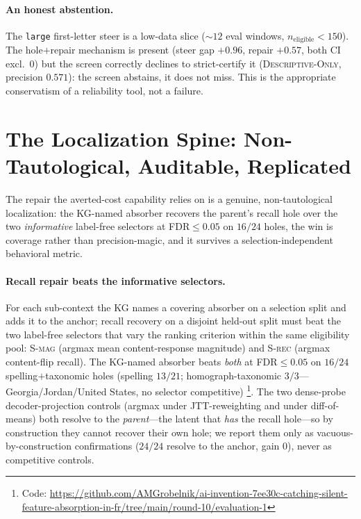 \documentclass[11pt,letterpaper]{article}
\begin{document}
\paragraph{An honest abstention.} The \texttt{large} first-letter steer is a low-data slice ($\sim12$ eval windows, $n_{\text{eligible}}<150$). The hole$+$repair mechanism is present (steer gap $+0.96$, repair $+0.57$, both CI excl.\ $0$) but the screen correctly declines to strict-certify it (\textsc{Descriptive-Only}, precision $0.571$): the screen abstains, it does not miss. This is the appropriate conservatism of a reliability tool, not a failure.

\section{The Localization Spine: Non-Tautological, Auditable, Replicated}
\label{sec:spine}

The repair the averted-cost capability relies on is a genuine, non-tautological localization: the KG-named absorber recovers the parent's recall hole over the two \emph{informative} label-free selectors at FDR$\le0.05$ on $16/24$ holes, the win is coverage rather than precision-magic, and it survives a selection-independent behavioral metric.

\paragraph{Recall repair beats the informative selectors.} For each sub-context the KG names a covering absorber on a selection split and adds it to the anchor; recall recovery on a disjoint held-out split must beat the two label-free selectors that vary the ranking criterion within the same eligibility pool: \textsc{S-mag} (argmax mean content-response magnitude) and \textsc{S-rec} (argmax content-flip recall). The KG-named absorber beats \emph{both} at FDR$\le0.05$ on $16/24$ spelling$+$taxonomic holes (spelling $13/21$; homograph-taxonomic $3/3$---Georgia/Jordan/United States, no selector competitive) \footnote{Code: \url{https://github.com/AMGrobelnik/ai-invention-7ee30c-catching-silent-feature-absorption-in-fr/tree/main/round-10/evaluation-1}}. The two dense-probe decoder-projection controls (argmax under JTT-reweighting and under diff-of-means) both resolve to the \emph{parent}---the latent that \emph{has} the recall hole---so by construction they cannot recover their own hole; we report them only as vacuous-by-construction confirmations ($24/24$ resolve to the anchor, gain $0$), never as competitive controls.
\end{document}
